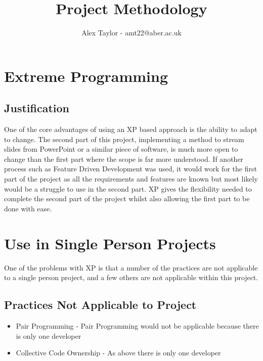 \documentclass{article}
\title{Project Methodology}
\author{Alex Taylor - amt22@aber.ac.uk}
\begin{document}
\maketitle
\tableofcontents
\thispagestyle{empty}

\newpage

\section{Extreme Programming}
\subsection{Justification}
One of the core advantages of using an XP based approach is the ability to adapt to change. The second part of this project, implementing a method to stream slides from PowerPoint or a similar piece of software, is much more open to change than the first part where the scope is far more understood. If another process such as Feature Driven Development was used, it would work for the first part of the project as all the requirements and features are known but most likely would be a struggle to use in the second part. XP gives the flexibility needed to complete the second part of the project whilst also allowing the first part to be done with ease.
\newpage

\section{Use in Single Person Projects}
One of the problems with XP is that a number of the practices are not applicable to a single person project, and a few others are not applicable within this project. 
\subsection{Practices Not Applicable to Project}
\begin{itemize}
	\item Pair Programming - Pair Programming would not be applicable because there is only one developer
	\item Collective Code Ownership - As above there is only one developer
\end{itemize}
\end{document}

